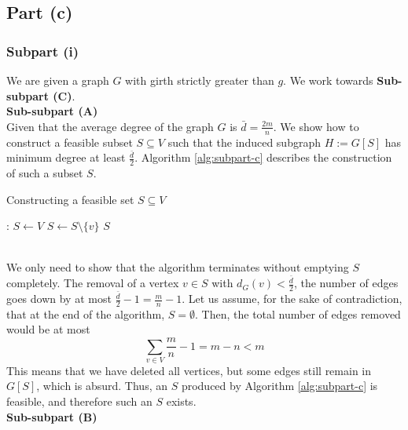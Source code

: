 \documentclass[9pt]{article}
\begin{document}
\subsection*{Part (c)}
\subsubsection*{Subpart (i)}
We are given a graph $G$ with girth strictly greater than $g$. We work towards \textbf{Sub-subpart (C)}.
\vspace*{10pt} \\
\textbf{Sub-subpart (A)}
\vspace*{5pt} \\
Given that the average degree of the graph $G$ is $\bar{d} = \frac{2m}{n}$. We show how to
construct a feasible subset $S \subseteq V$ such that the induced subgraph $H := G[S]$ has minimum
degree at least $\frac{\bar{d}}{2}$. Algorithm \ref{alg:subpart-c} describes the construction of
such a subset $S$.
\begin{algorithm}
    \caption{Constructing a feasible set $S \subseteq V$}
    \label{alg:subpart-c}
    \begin{algorithmic}[1]
        :
            \State $S \gets V$
                \State $S \gets S \setminus \{v\}$
            \EndWhile
            \State \Return $S$
        \EndProcedure
    \end{algorithmic}
\end{algorithm}
\vspace*{0pt} \\
We only need to show that the algorithm terminates without emptying $S$ completely. The removal
of a vertex $v \in S$ with $d_{G}(v) < \frac{\bar{d}}{2}$, the number of edges goes down by at
most $\frac{\bar{d}}{2} - 1 = \frac{m}{n} - 1$. Let us assume, for the sake of contradiction,
that at the end of the algorithm, $S = \emptyset$. Then, the total number of edges removed would
be at most
\begin{equation}
    \sum_{v \in V} \frac{m}{n} - 1 = m - n < m
\end{equation}
This means that we have deleted all vertices, but some edges still remain in $G[S]$, which is
absurd. Thus, an $S$ produced by Algorithm \ref{alg:subpart-c} is feasible, and therefore such
an $S$ exists.
\vspace*{10pt} \\
\textbf{Sub-subpart (B)}
\vspace*{5pt} \\
\end{document}

